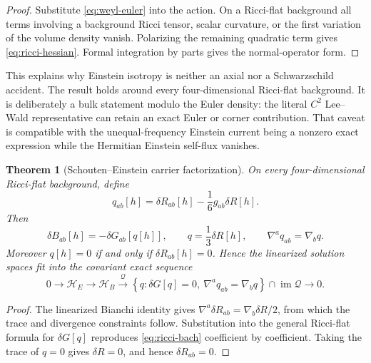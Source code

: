 \documentclass[11pt]{article}
\newtheorem{theorem}{Theorem}[section]
\theoremstyle{definition}
\theoremstyle{remark}
\begin{document}
\begin{proof}
Substitute \eqref{eq:weyl-euler} into the action.  On a Ricci-flat
background all terms involving a background Ricci tensor, scalar curvature,
or the first variation of the volume density vanish.  Polarizing the
remaining quadratic term gives \eqref{eq:ricci-hessian}.  Formal integration
by parts gives the normal-operator form.
\end{proof}

This explains why Einstein isotropy is neither an axial nor a Schwarzschild
accident.  The result holds around every four-dimensional Ricci-flat
background.  It is deliberately a bulk statement modulo the Euler density:
the literal \(C^2\) Lee--Wald representative can retain an exact Euler or
corner contribution.  That caveat is compatible with the unequal-frequency
Einstein current being a nonzero exact expression while the Hermitian
Einstein self-flux vanishes.

\begin{theorem}[Schouten--Einstein carrier factorization]
\label{thm:schouten-einstein}
On every four-dimensional Ricci-flat background, define
\[
q_{ab}[h]
=
\delta R_{ab}[h]-\frac16g_{ab}\delta R[h].
\]
Then
\begin{equation}
\label{eq:schouten-einstein}
\delta B_{ab}[h]=-\delta G_{ab}[q[h]],
\qquad
q=\frac13\delta R[h],
\qquad
\nabla^aq_{ab}=\nabla_bq .
\end{equation}
Moreover \(q[h]=0\) if and only if \(\delta R_{ab}[h]=0\).  Hence the
linearized solution spaces fit into the covariant exact sequence
\[
0\longrightarrow\mathcal H_E
\longrightarrow\mathcal H_B
\overset{\mathcal Q}{\longrightarrow}
\left\{
q:\delta G[q]=0,\ \nabla^aq_{ab}=\nabla_bq
\right\}\cap\operatorname{im}\mathcal Q
\longrightarrow0 .
\]
\end{theorem}

\begin{proof}
The linearized Bianchi identity gives
\(\nabla^a\delta R_{ab}=\nabla_b\delta R/2\), from which the trace and
divergence constraints follow.  Substitution into the general Ricci-flat
formula for \(\delta G[q]\) reproduces
\eqref{eq:ricci-bach} coefficient by coefficient.  Taking the trace of
\(q=0\) gives \(\delta R=0\), and hence \(\delta R_{ab}=0\).
\end{proof}
\end{document}
